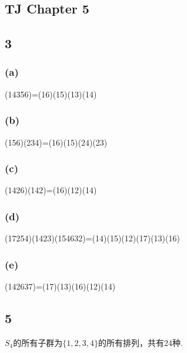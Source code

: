 \documentclass[twocolumn]{article}
\newenvironment{SChinese}{
	\CJKfamily{gbsn}
	\CJKtilde
	\CJKnospace}{}
\begin{document}
\begin{CJK}{UTF8}{}
\begin{SChinese}
			\section*{TJ Chapter 5}
				\subsection*{3}
					\subsubsection*{(a)}
						(14356)=(16)(15)(13)(14)
					\subsubsection*{(b)}
						(156)(234)=(16)(15)(24)(23)
					\subsubsection*{(c)}
						(1426)(142)=(16)(12)(14)
					\subsubsection*{(d)}
						(17254)(1423)(154632)=(14)(15)(12)(17)(13)(16)
					\subsubsection*{(e)}
						(142637)=(17)(13)(16)(12)(14)
				\subsection*{5}
					$S_4$的所有子群为$\{1,2,3,4\}$的所有排列，共有24种.\\

\end{SChinese}
\end{CJK}
\end{document}
